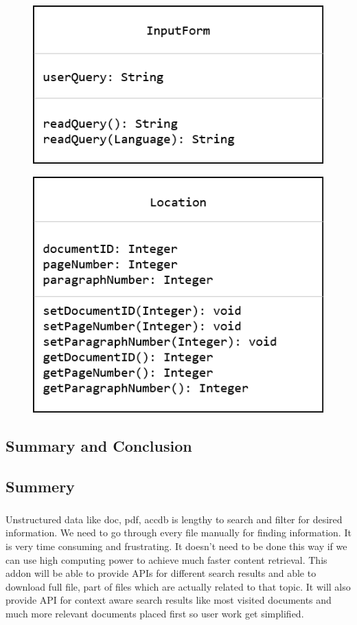 \documentclass[oneside,a4paper,12pt]{report}
\begin{document}
\begin{figure}[H]
\includegraphics{class_input_form}
\end{figure}

\begin{figure}[H]
\includegraphics{class_location}
\end{figure}


\begin{center}
\chapter{Summary and Conclusion}
\newpage
\end{center}

\section{Summery}
\paragraph{}
Unstructured data like doc, pdf, accdb is lengthy to search and filter for desired information. We need to go through every file manually for finding information. It is very time consuming and frustrating. It doesn’t need to be done this way if we can use high computing power to achieve much faster content retrieval. This addon will be able to provide APIs for different search results and able to download full file, part of files which are actually related to that topic. It will also provide API for context aware search results like most visited documents and much more relevant documents placed first so user work get simplified.    
\end{document}
